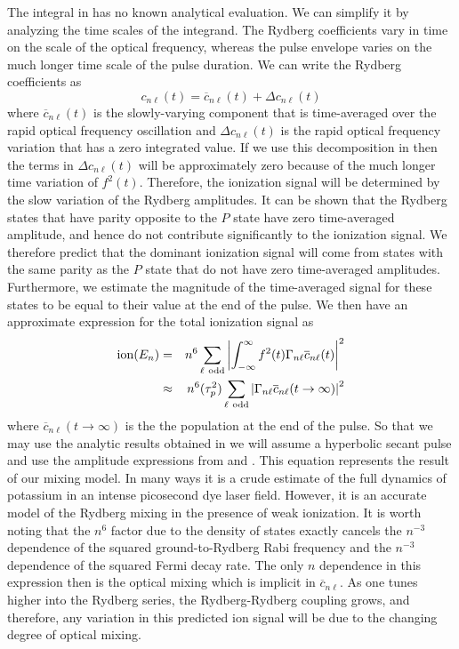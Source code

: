 The integral in  has no known analytical evaluation.  We can
simplify it by analyzing the time scales of the integrand.  The Rydberg
coefficients vary in time on the scale of the optical frequency, whereas the
pulse envelope varies on the much longer time scale of the pulse duration. 
We can write the Rydberg coefficients as
\begin{equation}
c_{n\ell}(t) = \overline{c}_{n\ell}(t) + \Delta c_{n\ell}(t)
\end{equation}
where $\overline{c}_{n\ell}(t)$ is the slowly-varying component that is
time-averaged over the rapid optical frequency oscillation and
$\Delta c_{n\ell}(t)$ is the rapid optical frequency variation that has a zero
integrated value.  If we use this decomposition in  then the terms
in $\Delta c_{n\ell}(t)$ will be approximately zero because of the much longer
time variation of $f^2(t)$.  Therefore, the ionization signal will be
determined by the slow variation of the Rydberg amplitudes.  It can be shown that
the Rydberg states that have parity opposite to the $P$ state have zero
time-averaged amplitude, and hence do not contribute significantly to the
ionization signal.  We therefore predict that the dominant ionization signal
will come from states with the same parity as the $P$ state that do not have
zero time-averaged amplitudes.  Furthermore, we estimate the magnitude of the
time-averaged signal for these states to be equal to their value at the end of
the pulse.  We then have an approximate expression for the total ionization
signal as
\begin{eqnarray}
{\rm ion}(E_n) &=& n^6 \sum_{\ell\ {\rm
odd}} \left| \int_{-\infty}^{\infty}f^2(t) \Gamma_{n\ell}\overline{c}_{n\ell}(t)
\right|^2 \\
&\approx& n^6 (\tau_p^2) \sum_{\ell\ {\rm odd}}\left| \Gamma_{n\ell}
\overline{c}_{n\ell}(t \rightarrow \infty) \right|^2 
\end{eqnarray}
where $\overline{c}_{n\ell}(t \rightarrow \infty)$ is the
the population at the end of the pulse.  So that we may use the
analytic results obtained in  we will assume a hyperbolic secant
pulse and use the amplitude expressions from  and .
This equation represents the result of our mixing model.  In many ways it is a
crude estimate of the full dynamics of potassium in an intense picosecond dye
laser field.  However, it is an accurate model of the Rydberg mixing in the
presence of weak ionization.  It is worth noting that the $n^6$ factor due to
the density of states exactly cancels the $n^{-3}$ dependence of the squared
ground-to-Rydberg Rabi frequency and the $n^{-3}$ dependence of the squared
Fermi decay rate.  The only $n$ dependence in this expression then is the optical
mixing which is implicit in $\overline{c}_{n\ell}$.  As one tunes higher into
the Rydberg series, the Rydberg-Rydberg coupling grows, and therefore, any
variation in this predicted ion signal will be due to the changing degree of
optical mixing.

